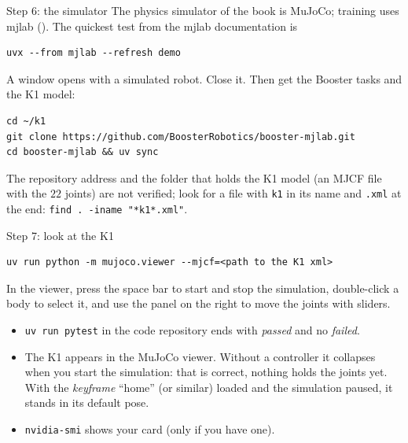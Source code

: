 \begin{stepbox}{Step 6: the simulator}
The physics simulator of the book is MuJoCo; training uses mjlab (). The quickest test from the mjlab documentation is
\begin{verbatim}
uvx --from mjlab --refresh demo
\end{verbatim}
A window opens with a simulated robot. Close it. Then get the Booster tasks and the K1 model:
\begin{verbatim}
cd ~/k1
git clone https://github.com/BoosterRobotics/booster-mjlab.git
cd booster-mjlab && uv sync
\end{verbatim}
The repository address and the folder that holds the K1 model (an MJCF file with the $22$ joints) are not verified\guess; look for a file with \texttt{k1} in its name and \texttt{.xml} at the end: \verb!find . -iname "*k1*.xml"!.
\end{stepbox}

\begin{stepbox}{Step 7: look at the K1}
\begin{verbatim}
uv run python -m mujoco.viewer --mjcf=<path to the K1 xml>
\end{verbatim}
In the viewer, press the space bar to start and stop the simulation, double-click a body to select it, and use the panel on the right to move the joints with sliders.
\end{stepbox}

\begin{checkbox}
\begin{itemize}[nosep]
  \item \verb!uv run pytest! in the code repository ends with \emph{passed} and no \emph{failed}.
  \item The K1 appears in the MuJoCo viewer. Without a controller it collapses when you start the simulation: that is correct, nothing holds the joints yet. With the \emph{keyframe} ``home'' (or similar)\guess{} loaded and the simulation paused, it stands in its default pose.
  \item \verb!nvidia-smi! shows your card (only if you have one).
\end{itemize}
\end{checkbox}

